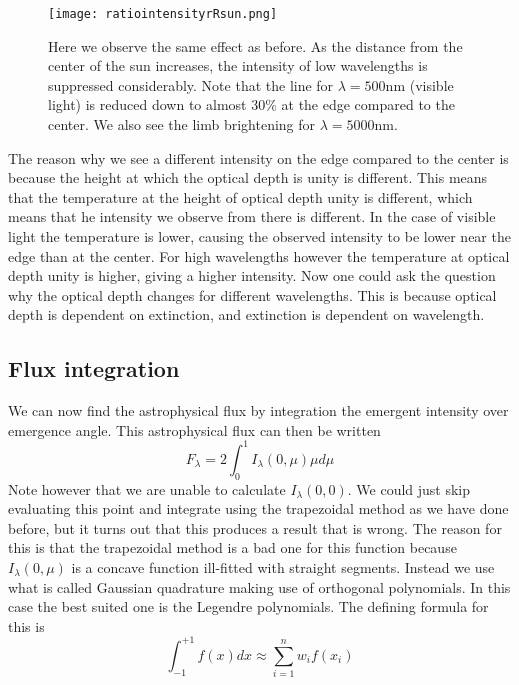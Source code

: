 \documentclass{aa}   %
\begin{document}
\begin{figure}
 \texttt{[image: ratiointensityrRsun.png]}
 \caption{Here we observe the same effect as before. As the distance from the center of the sun increases, the intensity of low wavelengths is suppressed considerably. Note that the line for $\lambda = 500$nm (visible light) is reduced down to almost $30\%$ at the edge compared to the center. We also see the limb brightening for $\lambda = 5000$nm.}
\label{ratiointensityrRsun}
\end{figure}
The reason why we see a different intensity on the edge compared to the center is because the height at which the optical depth is unity is different. This means that the temperature at the height of optical depth unity is different, which means that he intensity we observe from there is different. In the case of visible light the temperature is lower, causing the observed intensity to be lower near the edge than at the center. For high wavelengths however the temperature at optical depth unity is higher, giving a higher intensity. Now one could ask the question why the optical depth changes for different wavelengths. This is because optical depth is dependent on extinction, and extinction is dependent on wavelength. 

\subsection{Flux integration}
We can now find the astrophysical flux by integration the emergent intensity over emergence angle.
This astrophysical flux can then be written
\begin{equation}
 F_\lambda = 2\int_0^1 I_\lambda(0,\mu)\mu d\mu
\end{equation}
Note however that we are unable to calculate $I_\lambda(0,0)$. We could just skip evaluating this point and integrate using the trapezoidal method as we have done before, but it turns out that this produces a result that is wrong. The reason for this is that the trapezoidal method is a bad one for this function because $I_\lambda(0,\mu)$ is a concave function ill-fitted with straight segments. Instead we use what is called Gaussian quadrature making use of orthogonal polynomials. In this case the best suited one is the Legendre polynomials. The defining formula for this is
\begin{equation}
 \int_{-1}^{+1}f(x)dx \approx \sum_{i=1}^n w_i f(x_i)
\end{equation}
\end{document}
